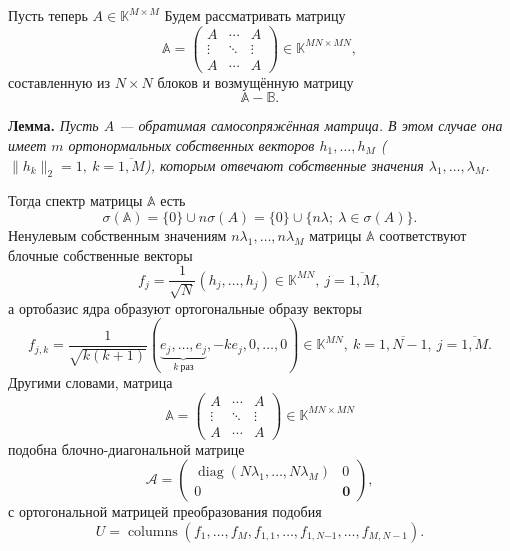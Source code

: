 Пусть теперь \( A\in \mathbb{K}^{M\times M} \)
Будем рассматривать матрицу
\[
    \mathbb{A} =
    \begin{pmatrix}
        A      & \cdots & A \\
        \vdots & \ddots & \vdots \\
        A      & \cdots & A
    \end{pmatrix}
    \in \mathbb{K}^{MN{\times}MN},
    \]
    составленную из \( N\times N \) блоков
    и возмущённую матрицу
\[
    \mathbb{A} - \mathbb{B}.
    \]

\begingroup
\textbf{Лемма.}\itshape
    Пусть \( A \) --- обратимая самосопряжённая матрица.
    В этом случае она имеет \( m \) ортонормальных
    собственных векторов \( h_1, \ldots, h_M \)
    (\( \|h_k\|_2=1,\ k{=}\overline{1,M} \)),
    которым отвечают собственные значения \( \lambda_1, \ldots, \lambda_M \).

    Тогда спектр матрицы \( \mathbb{A} \) есть
    \[
        \sigma(\mathbb{A}) = \{0\} \cup n\sigma(A)
        = \{ 0 \} \cup \{ n\lambda;\ \lambda\in\sigma(A) \}.
        \]
    Ненулевым собственным значениям \( n\lambda_1, \ldots, n\lambda_M \)
    матрицы \( \mathbb{A} \)
    соответствуют блочные собственные векторы
    \[
        f_j = \frac{1}{\sqrt{N}}(h_j, \ldots, h_j)\in\mathbb{K}^{MN},
        \ j{=}\overline{1,M},
       \]
    а ортобазис ядра образуют ортогональные образу
    векторы
    \[
        f_{j,k} =
        \frac{1}{\sqrt{k(k+1)}}
        (\underbrace{e_j,\ldots,e_j}_{k\ \text{раз}}, -ke_j, 0, \ldots, 0)\in\mathbb{K}^{MN},
        \ k{=}\overline{1,N-1},
        \ j{=}\overline{1,M}.
        \]
    Другими словами, матрица
    \[
        \mathbb{A} = 
        \begin{pmatrix}
            A      & \cdots & A \\
            \vdots & \ddots & \vdots \\
            A      & \cdots & A
        \end{pmatrix}
        \in\mathbb{K}^{MN{\times}MN}
        \]
    подобна блочно-диагональной матрице
    \[
        \mathcal{A} =
        \left(\begin{array}{c|c}
            \operatorname{diag}(N\lambda_1,\ldots,N\lambda_M) & 0 \\ \hline
            0 & \mathbf{0}
        \end{array}\right),
        \]
    с ортогональной матрицей преобразования подобия
    \[
        U = \operatorname{columns}
        \left(f_1, \ldots, f_M, f_{1,1}, \ldots, f_{1,N{-1}}, \ldots, f_{M,N{-}1}\right).
        \]
\endgroup

